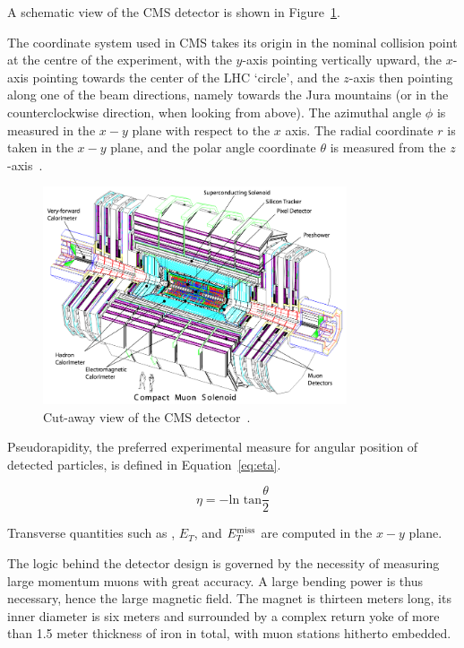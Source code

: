  A schematic view of the CMS
detector is shown in Figure~\ref{fig:cutaway}.


The coordinate system used in CMS takes its origin in the nominal
collision point at the centre of the experiment, with the $y$-axis
pointing vertically upward, the $x$-axis pointing towards the center
of the LHC `circle', and the $z$-axis then pointing along one of the
beam directions, namely towards the Jura mountains (or in the
counterclockwise direction, when looking from above). The azimuthal
angle $\phi$ is measured in the $x-y$ plane with respect to the $x$ axis. The
radial coordinate $r$ is taken in the $x-y$ plane, and the polar angle
coordinate $\theta$ is measured from the
$z$-axis~\cite{Chatrchyan:2008aa}.

\begin{figure}[htb]
  \begin{center}
    \includegraphics[width=0.8\textwidth]{Chapters/xLHCMS/cutawayCMS.png}
    \caption{Cut-away view of the CMS detector~\cite{Chatrchyan:2008aa}.}
    \label{fig:cutaway}
  \end{center}
\end{figure}


Pseudorapidity, the preferred experimental measure for angular
position of detected particles, is defined in
Equation~\ref{eq:eta}. 

\begin{equation}
\label{eq:eta}
\eta = - \textrm{ln tan} \frac{\theta}{2}
\end{equation}

Transverse quantities such as \pt, $E_{T}$,
and $E^{\rm miss}_{T}$ are computed in the $x-y$ plane.


The logic behind the detector design is governed by the necessity of
measuring large momentum muons with great accuracy. A large bending
power is thus necessary, hence the large magnetic field. The magnet is
thirteen meters long, its inner diameter is six meters and surrounded
by a complex return yoke of more than 1.5 meter thickness of iron in total,
with muon stations hitherto embedded. 


